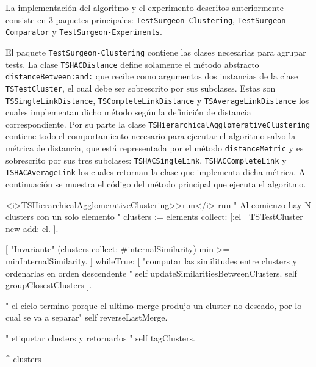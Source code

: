 \par La implementación del algoritmo y el experimento descritos anteriormente consiste en 3 paquetes principales: {\tt TestSurgeon-Clustering},  {\tt TestSurgeon-Comparator} y {\tt TestSurgeon-Experiments}. 


\par El paquete {\tt TestSurgeon-Clustering} contiene las clases necesarias para agrupar tests. La clase {\tt TSHACDistance} define solamente el método abstracto {\tt distanceBetween:and:} que recibe como argumentos dos instancias de la clase {\tt TSTestCluster}, el cual debe ser sobrescrito por sus subclases. Estas son {\tt TSSingleLinkDistance}, {\tt TSCompleteLinkDistance} y {\tt TSAverageLinkDistance} los cuales implementan dicho método según la definición de distancia correspondiente. Por su parte la clase {\tt TSHierarchicalAgglomerativeClustering} contiene todo el comportamiento necesario para ejecutar el algoritmo salvo la métrica de distancia, que está representada por el método {\tt distanceMetric} y es sobrescrito por sus tres subclases: {\tt TSHACSingleLink}, {\tt TSHACCompleteLink} y {\tt TSHACAverageLink} los cuales retornan la clase que implementa dicha métrica. A continuación se muestra el código del método principal que ejecuta el algoritmo.

\vspace*{2cm}

\begin{codeWithLineNumbers}
<i>TSHierarchicalAgglomerativeClustering>>run</i>
run
	" Al comienzo hay N clusters con un solo elemento "
	clusters := elements collect: [:el | TSTestCluster new add: el. ].
	
	[
		"Invariante"
		(clusters collect: #internalSimilarity) min >= minInternalSimilarity.
	] 
		whileTrue: [ 
			"computar las similitudes entre clusters y ordenarlas en orden descendente "
			self updateSimilaritiesBetweenClusters.
			self groupClosestClusters
	].
		
	" el ciclo termino porque el ultimo merge produjo un cluster no deseado, por lo cual se va a separar"
	self reverseLastMerge. 
	
	" etiquetar clusters y retornarlos "
	self tagClusters.
	
	^ clusters
\end{codeWithLineNumbers}

